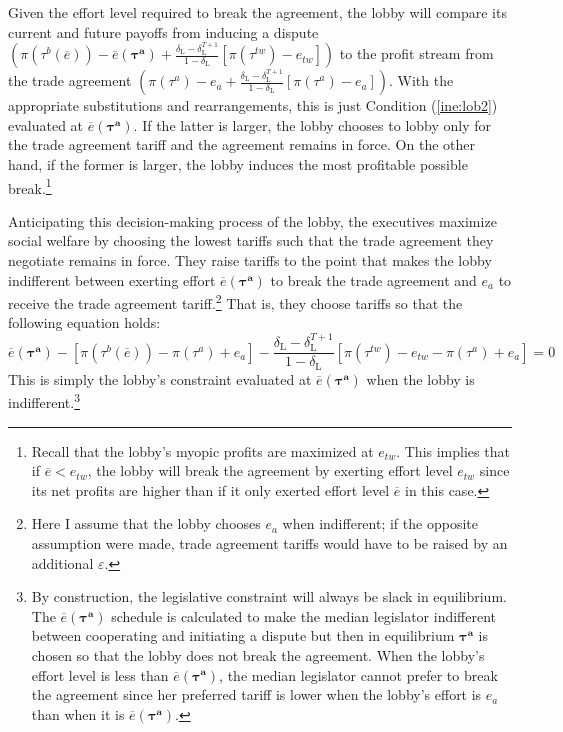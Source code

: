 \documentclass[authoryear, review]{elsarticle}
\newcommand{\ov}{\overline}
\newcommand{\bta}{\bm{\tau^a}}
\newcommand{\de}{\delta}
\begin{document}
Given the effort level required to break the agreement, the lobby will compare its current and future payoffs from inducing a dispute $\left(\pi(\tau^b(\ov{e})) - \ov{e}(\bta) + \frac{\de_\text{L} - \de_\text{L}^{T+1}}{1-\de_\text{L}} \left[\pi(\tau^{tw}) -e_{tw}\right] \right)$ to the profit stream from the trade agreement $\left(\pi(\tau^a) - e_a + \frac{\de_\text{L} - \de_\text{L}^{T+1}}{1-\de_\text{L}} \left[\pi(\tau^a) -e_a\right] \right)$. With the appropriate substitutions and rearrangements, this is just Condition (\ref{ine:lob2}) evaluated at $\ov{e}(\bta)$. If the latter is larger, the lobby chooses to lobby only for the trade agreement tariff and the agreement remains in force. On the other hand, if the former is larger, the lobby induces the most profitable possible break.\footnote{Recall that the lobby's myopic profits are maximized at $e_{tw}$. This implies that if $\ov{e} < e_{tw}$, the lobby will break the agreement by exerting effort level $e_{tw}$ since its net profits are higher than if it only exerted effort level $\ov{e}$ in this case.} 

Anticipating this decision-making process of the lobby, the executives maximize social welfare by choosing the lowest tariffs such that the trade agreement they negotiate remains in force. They raise tariffs to the point that makes the lobby indifferent between exerting effort $\ov{e}(\bta)$ to break the trade agreement and $e_a$ to receive the trade agreement tariff.\footnote{Here I assume that the lobby chooses $e_a$ when indifferent; if the opposite assumption were made, trade agreement tariffs would have to be raised by an additional $\varepsilon$.} That is, they choose tariffs so that the following equation holds:
\begin{equation}
  \ov{e}(\bta) - \left[ \pi(\tau^b(\ov{e})) - \pi(\tau^a) + e_a\right] - \frac{\de_\text{L} - \de_\text{L}^{T+1}}{1-\de_\text{L}} \left[\pi(\tau^{tw}) -e_{tw} - \pi(\tau^a) + e_a \right] = 0
  \label{eq:lob2}
\end{equation}
This is simply the lobby's constraint evaluated at $\ov{e}(\bta)$ when the lobby is indifferent.\footnote{By construction, the legislative constraint will always be slack in equilibrium. The $\ov{e}(\bta)$ schedule is calculated to make the median legislator indifferent between cooperating and initiating a dispute but then in equilibrium $\bta$ is chosen so that the lobby does not break the agreement. When the lobby's effort level is less than $\ov{e}(\bta)$, the median legislator cannot prefer to break the agreement since her preferred tariff is lower when the lobby's effort is $e_a$ than when it is $\ov{e}(\bta)$.}
\end{document}
